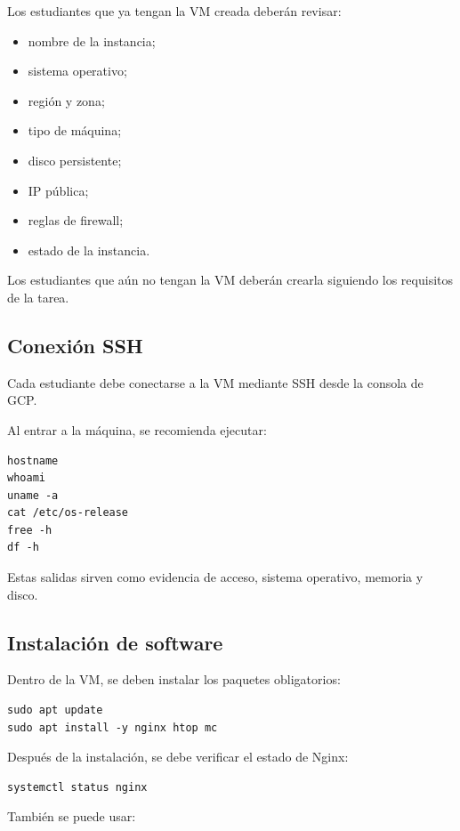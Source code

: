 \documentclass[
  coursetitle={Cómputo Nube y Tecnologías Emergentes},
  coursehours={96},
  coursedate={Verano 2026},
  doctype={Práctica},
  otherlangs={english,french},
  authorname={Lázaro},
  authorsurname={Bustio-Martínez},
  authortitle={PhD},
  role={Profesor Investigador},
  email={lbustio@inaoe.mx},
  phone={5559504000},
  ext={7459},
  institution={Instituto Nacional de Astrofísica, Óptica y Electrónica (INAOE)},
  department={Maestría en Ciencias en Tecnologías de Seguridad},
  address={Luis Enrique Erro 1, Sta. Ma. Tonantzintla, San Andrés Cholula, CP 72840, Puebla, México},
  margin={0.5in}
]{../../lbustio_lecture_notes}
\begin{document}
Los estudiantes que ya tengan la VM creada deberán revisar:

\begin{itemize}
    \item nombre de la instancia;
    \item sistema operativo;
    \item región y zona;
    \item tipo de máquina;
    \item disco persistente;
    \item IP pública;
    \item reglas de firewall;
    \item estado de la instancia.
\end{itemize}

Los estudiantes que aún no tengan la VM deberán crearla siguiendo los requisitos de la tarea.

\subsection{Conexión SSH}

Cada estudiante debe conectarse a la VM mediante SSH desde la consola de GCP.

Al entrar a la máquina, se recomienda ejecutar:

\begin{lstlisting}
hostname
whoami
uname -a
cat /etc/os-release
free -h
df -h
\end{lstlisting}

Estas salidas sirven como evidencia de acceso, sistema operativo, memoria y disco.

\subsection{Instalación de software}

Dentro de la VM, se deben instalar los paquetes obligatorios:

\begin{lstlisting}
sudo apt update
sudo apt install -y nginx htop mc
\end{lstlisting}

Después de la instalación, se debe verificar el estado de Nginx:

\begin{lstlisting}
systemctl status nginx
\end{lstlisting}

También se puede usar:
\end{document}
